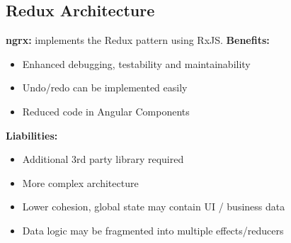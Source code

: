 \subsection{Redux Architecture}
\textbf{ngrx:} implements the Redux pattern using RxJS.
\textbf{Benefits:}
\begin{itemize}[topsep=0pt, leftmargin=3mm]
    \setlength\itemsep{-0.3em}
    \item Enhanced debugging, testability and maintainability
    \item Undo/redo can be implemented easily
    \item Reduced code in Angular Components
\end{itemize}
\textbf{Liabilities:}
\begin{itemize}[topsep=0pt, leftmargin=3mm]
    \setlength\itemsep{-0.3em}
    \item Additional 3rd party library required
    \item More complex architecture
    \item Lower cohesion, global state may contain UI / business data
    \item Data logic may be fragmented into multiple effects/reducers
\end{itemize}